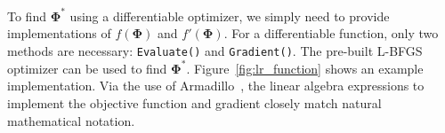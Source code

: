 \documentclass[twoside,11pt]{article}
\begin{document}

To find $\bm \Phi^*$ using a differentiable optimizer,
we simply need to provide implementations of $f(\bm \Phi)$ and $f'(\bm \Phi)$.
For a differentiable function, only two methods are necessary:
{\tt Evaluate()} and {\tt Gradient()}.
The pre-built L-BFGS optimizer can be used to find $\bm \Phi^*$.
Figure~\ref{fig:lr_function} shows an example implementation.
Via the use of Armadillo~\citep{sanderson2016armadillo},
the linear algebra expressions to implement the objective function and gradient
closely match natural mathematical notation.






%
\end{document}
